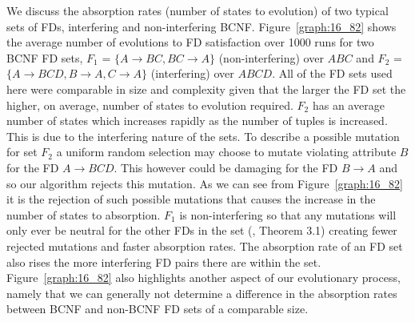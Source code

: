 We discuss the absorption rates (number of states to
evolution) of two typical sets of FDs, 
interfering and non-interfering BCNF. Figure~\ref{graph:16_82}
shows the average number of evolutions to FD satisfaction over 1000 runs for
two BCNF FD sets, $F_1$ = $\{ A \to BC, BC \to A \}$ (non-interfering)
over $ABC$ and 
$F_2$ = $\{ A \to BCD, B \to A, C \to A \}$ (interfering) over $ABCD$.
  All of the
FD sets used here were comparable in size and complexity given that the larger
the FD set the higher, on average, number of states to evolution required.
$F_2$ has an average number of states which increases
rapidly as the number of tuples is increased. This is due to the
interfering nature of the sets. To describe a possible mutation
for set $F_2$ a uniform random selection may choose to mutate violating
attribute $B$ for the FD $A \to BCD$. This however could be damaging for
the FD $B \to A$ and so our algorithm rejects this mutation. As we
can see from Figure~\ref{graph:16_82} it is the rejection of such
possible mutations that causes the increase in the number of states
to absorption. $F_1$ is non-interfering so that
any mutations will only ever be neutral for the other FDs in the set 
(\cite{cl96}, Theorem 3.1) creating fewer rejected mutations
and faster absorption rates. The absorption rate of an FD set also
rises the more interfering FD pairs there are within
the set.
Figure~\ref{graph:16_82}  also highlights another
aspect of our evolutionary process, namely that we can generally not determine
 a difference in the 
absorption rates between BCNF and non-BCNF FD sets of a comparable
size. \\


